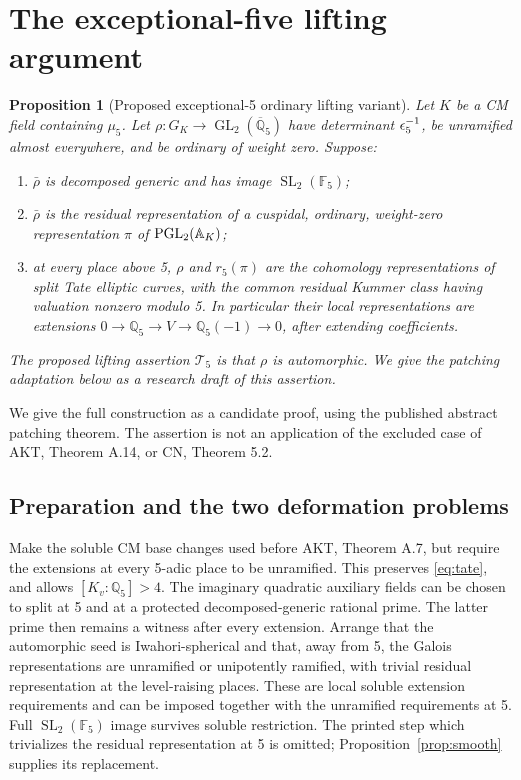 \documentclass[11pt,a4paper]{article}
\newtheorem{proposition}[theorem]{Proposition}
\theoremstyle{definition}\newtheorem{definition}[theorem]{Definition}
\theoremstyle{remark}\newtheorem*{remark}{Remark}
\newcommand{\Q}{\mathbb Q}\newcommand{\Z}{\mathbb Z}
\newcommand{\F}{\mathbb F}\newcommand{\OO}{\mathcal O}
\newcommand{\GL}{\operatorname{GL}}\newcommand{\SL}{\operatorname{SL}}
\newcommand{\Tinput}{\mathcal T_5}
\begin{document}
\section{The exceptional-five lifting argument}
\label{sec:patch}

\begin{proposition}[Proposed exceptional-5 ordinary lifting variant]
\label{prop:global}
Let $K$ be a CM field containing $\mu_5$. Let
$\rho:G_K\to\GL_2(\overline{\Q}_5)$ have determinant $\epsilon_5^{-1}$,
be unramified almost everywhere, and be ordinary of weight zero. Suppose:
\begin{enumerate}
\item $\bar\rho$ is decomposed generic and has image $\SL_2(\F_5)$;
\item $\bar\rho$ is the residual representation of a cuspidal, ordinary,
weight-zero representation $\pi$ of $\operatorname{PGL}_2(\mathbb A_K)$;
\item at every place above 5, $\rho$ and $r_5(\pi)$ are the cohomology
representations of split Tate elliptic curves, with the common residual
Kummer class having valuation nonzero modulo 5. In particular their local
representations are extensions
$0\to\Q_5\to V\to\Q_5(-1)\to0$, after extending coefficients.
\end{enumerate}
The proposed lifting assertion $\Tinput$ is that $\rho$ is automorphic.
We give the patching adaptation below as a research draft of this assertion.
\end{proposition}

We give the full construction as a candidate proof, using the published
abstract patching theorem. The assertion is not an application of the excluded
case of AKT, Theorem A.14, or CN, Theorem 5.2.

\subsection{Preparation and the two deformation problems}

Make the soluble CM base changes used before AKT, Theorem A.7, but require
the extensions at every 5-adic place to be unramified. This preserves
\eqref{eq:tate}, and allows $[K_v:\Q_5]>4$. The imaginary quadratic auxiliary
fields can be chosen to split at 5 and at a protected decomposed-generic
rational prime. The latter prime then remains a witness after every extension.
Arrange that the automorphic seed is Iwahori-spherical and that, away from 5,
the Galois representations are unramified or unipotently ramified, with
trivial residual representation at the level-raising places. These are
local soluble extension requirements and can be imposed together with the
unramified requirements at 5. Full $\SL_2(\F_5)$ image survives soluble
restriction. The printed step which trivializes the residual representation
at 5 is omitted; Proposition~\ref{prop:smooth} supplies its replacement.
\end{document}
